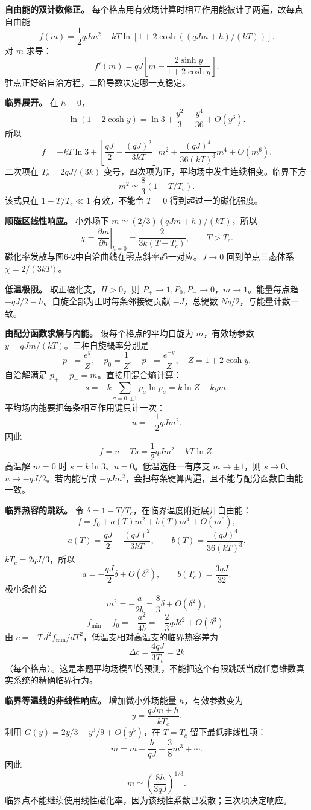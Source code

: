 \documentclass[12pt,a4paper,UTF8]{ctexart}
\begin{document}
\textbf{自由能的双计数修正。}
每个格点用有效场计算时相互作用能被计了两遍，故每点自由能 \[
f(m)=\frac12qJm^2-kT\ln[1+2\cosh((qJm+h)/(kT))].
\] 对 \(m\) 求导： \[
f'(m)=qJ\left[m-\frac{2\sinh y}{1+2\cosh y}\right].
\] 驻点正好给自洽方程，二阶导数决定哪一支稳定。

\textbf{临界展开。} 在 \(h=0\)， \[
\ln(1+2\cosh y)=\ln3+\frac{y^2}3-\frac{y^4}{36}+O(y^6).
\] 所以 \[
f=-kT\ln3+
\left[\frac{qJ}2-\frac{(qJ)^2}{3kT}\right]m^2
+\frac{(qJ)^4}{36(kT)^3}m^4+O(m^6).
\] 二次项在 \(T_c=2qJ/(3k)\)
变号，四次项为正，平均场中发生连续相变。临界下方 \[
\boxed{m^2\simeq\frac83(1-T/T_c)}.
\] 该式只在 \(1-T/T_c\ll1\) 有效，不能令 \(T=0\) 得到超过一的磁化强度。

\textbf{顺磁区线性响应。} 小外场下 \(m\simeq(2/3)(qJm+h)/(kT)\)，所以 \[
\boxed{\chi=\left.\frac{\partial m}{\partial h}\right|_{h=0}
=\frac{2}{3k(T-T_c)}},\qquad T>T_c.
\] 磁化率发散与图6-2中自洽曲线在零点斜率趋一对应。\(J\to0\)
回到单点三态体系 \(\chi=2/(3kT)\)。

\textbf{低温极限。} 取正磁化支，\(H>0\)，则
\(P_+\to1,P_0,P_-\to0\)，\(m\to1\)。能量每点趋
\(-qJ/2-h\)。自旋全部为正时每条邻接键贡献 \(-J\)，总键数
\(Nq/2\)，与能量计数一致。

\textbf{由配分函数求熵与内能。} 设每个格点的平均自旋为 \(m\)，有效场参数
\(y=qJm/(kT)\)。三种自旋概率分别是 \[
p_+=\frac{e^y}{Z},\quad p_0=\frac1Z,\quad
p_-=\frac{e^{-y}}Z,\quad Z=1+2\cosh y.
\] 自洽解满足 \(p_+-p_-=m\)。直接用混合熵计算： \[
s=-k\sum_{\sigma=0,\pm1}p_\sigma\ln p_\sigma
=k\ln Z-kym.
\] 平均场内能要把每条相互作用键只计一次： \[
u=-\frac12qJm^2.
\] 因此 \[
f=u-Ts=\frac12qJm^2-kT\ln Z.
\] 高温解 \(m=0\) 时 \(s=k\ln3\)、\(u=0\)。低温选任一有序支
\(m\to\pm1\)，则 \(s\to0\)、\(u\to-qJ/2\)。若内能写成
\(-qJm^2\)，会把每条键算两遍，且不能与配分函数自由能一致。

\textbf{临界热容的跳跃。} 令
\(\delta=1-T/T_c\)，在临界温度附近展开自由能： \[
f=f_0+a(T)m^2+b(T)m^4+O(m^6),
\] \[
a(T)=\frac{qJ}{2}-\frac{(qJ)^2}{3kT},
\qquad b(T)=\frac{(qJ)^4}{36(kT)^3}.
\] \(kT_c=2qJ/3\)，所以 \[
a=-\frac{qJ}{2}\delta+O(\delta^2),
\qquad b(T_c)=\frac{3qJ}{32}.
\] 极小条件给 \[
m^2=-\frac a{2b}=\frac83\delta+O(\delta^2),
\] \[
f_{\min}-f_0=-\frac{a^2}{4b}
=-\frac23qJ\delta^2+O(\delta^3).
\] 由 \(c=-T\,d^2f_{\min}/dT^2\)，低温支相对高温支的临界热容差为 \[
\boxed{\Delta c=\frac{4qJ}{3T_c}=2k}
\]
（每个格点）。这是本题平均场模型的预测，不能把这个有限跳跃当成任意维数真实系统的精确临界行为。

\textbf{临界等温线的非线性响应。} 增加微小外场能量 \(h\)，有效参数变为
\[
y=\frac{qJm+h}{kT_c}.
\] 利用 \(G(y)=2y/3-y^3/9+O(y^5)\)，在 \(T=T_c\) 留下最低非线性项： \[
m=m+\frac h{qJ}-\frac38m^3+\cdots.
\] 因此 \[
\boxed{m\simeq\left(\frac{8h}{3qJ}\right)^{1/3}}.
\] 临界点不能继续使用线性磁化率，因为该线性系数已发散；三次项决定响应。
\end{document}
